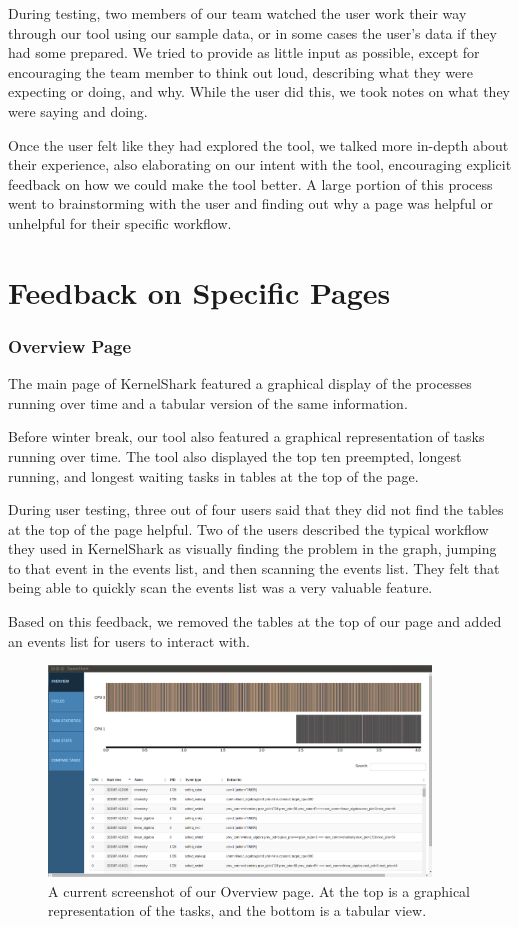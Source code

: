 \documentclass{hmcclinic}
\begin{document}
During testing, two members of our team watched the user work their way through
our tool using our sample data, or in some cases the user's data if they had
some prepared. We tried to provide as little input as possible, except for
encouraging the team member to think out loud, describing what they were
expecting or doing, and why. While the user did this, we took notes on what they
were saying and doing.

Once the user felt like they had explored the tool, we talked more in-depth
about their experience, also elaborating on our intent with the tool,
encouraging explicit feedback on how we could make the tool better. A large
portion of this process went to brainstorming with the user and finding out why
a page was helpful or unhelpful for their specific workflow.

\section{Feedback on Specific Pages} %

\subsubsection{Overview Page}

The main page of KernelShark featured a graphical display of the processes
running over time and a tabular version of the same information.

Before winter break, our tool also featured a graphical representation of tasks
running over time. The tool also displayed the top ten preempted, longest
running, and longest waiting tasks in tables at the top of the page. 

During user testing, three out of four users said that they did not find the
tables at the top of the page helpful. Two of the users described the typical
workflow they used in KernelShark as visually finding the problem in the graph,
jumping to that event in the events list, and then scanning the events list.
They felt that being able to quickly scan the events list was a very valuable
feature.

Based on this feedback, we removed the tables at the top of our page and added
an events list for users to interact with.

\begin{figure}[H]
\begin{center}
\includegraphics[width=4in]{overview-page.png}
\caption{A current screenshot of our Overview page. At the top is a graphical
representation of the tasks, and the bottom is a tabular view.}
\end{center}
\end{figure}
\end{document}
